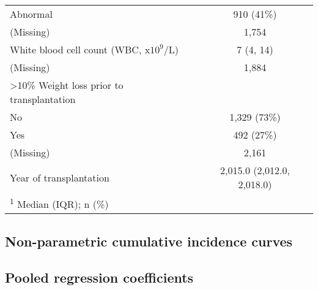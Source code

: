 \documentclass[
  12pt,
  a4paper,
]{article}
\begin{document}
\begin{longtable}[t]{lc}
\hspace{1em}Abnormal & 910 (41\%)\\
\hspace{1em}(Missing) & 1,754\\
White blood cell count (WBC, x$10^9$/L) & 7 (4, 14)\\
\hspace{1em}(Missing) & 1,884\\
>10\% Weight loss prior to transplantation & \\
\hspace{1em}No & 1,329 (73\%)\\
\hspace{1em}Yes & 492 (27\%)\\
\hspace{1em}(Missing) & 2,161\\
Year of transplantation & 2,015.0 (2,012.0, 2,018.0)\\
\bottomrule
\multicolumn{2}{l}{\rule{0pt}{1em}\textsuperscript{1} Median (IQR); n (\%)}\\

\end{longtable}

\subsection{Non-parametric cumulative incidence
curves}\label{non-parametric-cumulative-incidence-curves}

\subsection{Pooled regression
coefficients}\label{pooled-regression-coefficients}

\begingroup\fontsize{9}{11}\selectfont
\end{document}
